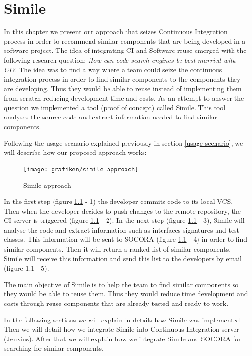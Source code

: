 \chapter{Simile}
\label{chap:simile}
In this chapter we present our approach that seizes Continuous Integration process in order to recommend similar components that are being developed in a software project. The idea of integrating CI and Software reuse emerged with the following research question: \emph{How can code search engines be best married with CI?}. The idea was to find a way where a team could seize the continuous integration process in order to find similar components to the components they are developing. Thus they would be able to reuse instead of implementing them from scratch reducing development time and costs. As an attempt to answer the question we implemented a tool (proof of concept) called Simile. This tool analyses the source code and extract information needed to find similar components.

Following the usage scenario explained previously in section \ref{usage-scenario}, we will describe how our proposed approach works:

\begin{figure}[H]
	\centering
    \texttt{[image: grafiken/simile-approach]}
    \caption{Simile approach}
    \label{fig:simile-01}
\end{figure}

In the first step (figure \ref{fig:simile-01} - 1) the developer commits code to its local VCS. Then when the developer decides to push changes to the remote repository, the CI server is triggered (figure \ref{fig:simile-01} - 2). In the next step (figure \ref{fig:simile-01} - 3), Simile will analyse the code and extract information such as interfaces signatures and test classes. This information will be sent to SOCORA (figure \ref{fig:simile-01} - 4) in order to find similar components. Then it will return a ranked list of similar components. Simile will receive this information and send this list to the developers by email (figure \ref{fig:simile-01} - 5).

The main objective of Simile is to help the team to find similar components so they would be able to reuse them. Thus they would reduce time development and costs through reuse components that are already tested and ready to work.

In the following sections we will explain in details how Simile was implemented. Then we will detail how we integrate Simile into Continuous Integration server (Jenkins). After that we will explain how we integrate Simile and SOCORA for searching for similar components.

